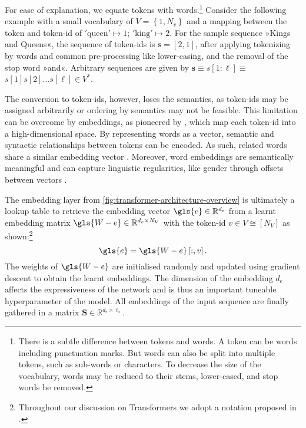 For ease of explanation, we equate \glspl{token} with words.\footnote{There is a subtle difference between \glspl{token} and words. A \gls{token} can be words including punctuation marks. But words can also be split into multiple \glspl{token}, such as sub-words \autocite[][3]{bojanowskiEnrichingWordVectors2017} or characters. To decrease the size of the vocabulary, words may be reduced to their stems, lower-cased, and stop words be removed.} Consider the following example with a small vocabulary of $V=\left\{1, N_v\right\}$ and a mapping between the \gls{token} and token-id of $\mathrm{'queen'}\mapsto 1$; $\mathrm{'king'}\mapsto 2$. For the sample sequence »Kings and Queens«, the sequence of token-ids is $\mathbf{s}=[2, 1]$, after applying tokenizing by words and common pre-processing like lower-casing, and the removal of the stop word »and«. Arbitrary sequences are given by $\mathbf{s} \equiv s[1: \ell] \equiv$ $s[1] s[2] \ldots s[\ell] \in V^*$.

The conversion to token-ids, however, loses the semantics, as token-ids may be assigned arbitrarily or ordering by semantics may not be feasible. This limitation can be overcome by embeddings, as pioneered by \textcite[][1139]{bengioNeuralProbabilisticLanguage}, which map each token-id into a high-dimensional space. By representing words as a vector, semantic and syntactic relationships between tokens can be encoded. As such, related words share a similar embedding vector \autocite[][1139]{bengioNeuralProbabilisticLanguage}. Moreover, word embeddings are semantically meaningful and can capture linguistic regularities, like gender through offsets between vectors \autocite[][748--749]{mikolovLinguisticRegularitiesContinuous2013}.

The embedding layer from \cref{fig:transformer-architecture-overview} is ultimately a lookup table to retrieve the embedding vector $\gls{e} \in \mathbb{R}^{d_{e}}$ from a learnt embedding matrix $\gls{W-e} \in \mathbb{R}^{d_{e} \times N_{V}}$ with the token-id $v \in V \cong\left[N_{V}\right]$ as shown:\footnote{Throughout our discussion on Transformers we adopt a notation proposed in \textcite[][1--16]{phuongFormalAlgorithmsTransformers2022}.}
\begin{equation}
    \gls{e}=\gls{W-e}\left[:, v\right].
    \label{eq:word-embeddings}
\end{equation}
The weights of $\gls{W-e}$ are initialised randomly and updated using gradient descent to obtain the learnt embeddings. The dimension of the embedding $d_e$ affects the expressiveness of the network and is thus an important tuneable hyperparameter of the model. All embeddings of the input sequence are finally gathered in a matrix $\mathbf{S} \in \mathbb{R}^{d_e \times \ell_s}$.

